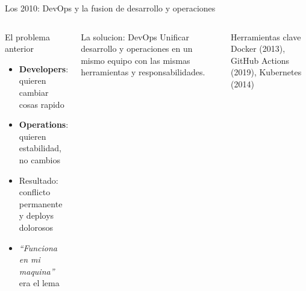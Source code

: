 \documentclass[aspectratio=169]{beamer}
\begin{document}
\begin{frame}{Los 2010: DevOps y la fusion de desarrollo y operaciones}
  \begin{columns}
    \begin{block}{El problema anterior}
      \begin{itemize}
        \item \textbf{Developers}: quieren cambiar cosas rapido
        \item \textbf{Operations}: quieren estabilidad, no cambios
        \item Resultado: conflicto permanente y deploys dolorosos
        \item \textit{``Funciona en mi maquina''} era el lema
      \end{itemize}
    \end{block}

    \vspace{0.3cm}

    \begin{exampleblock}{La solucion: DevOps}
      Unificar desarrollo y operaciones en un mismo equipo con las mismas herramientas y responsabilidades.
    \end{exampleblock}

    \begin{center}
    \end{center}

    \begin{block}{Herramientas clave}
      Docker (2013), GitHub Actions (2019), Kubernetes (2014)
    \end{block}
  \end{columns}
\end{frame}
\end{document}
